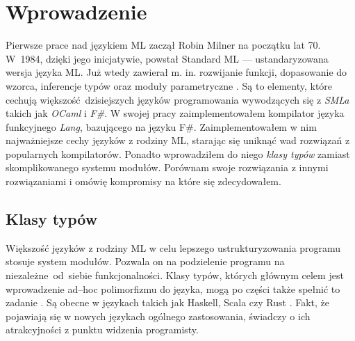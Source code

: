 \documentclass[declaration,shortabstract]{iithesis}
\author         {Mateusz Lewko}
\date           {}                     %
\begin{document}

\chapter{Wprowadzenie}

Pierwsze prace nad językiem ML zaczął Robin Milner na początku lat 70. W~1984, 
dzięki jego inicjatywie, powstał Standard ML --- ustandaryzowana wersja języka 
ML. Już wtedy zawierał m. in. rozwijanie funkcji, dopasowanie do wzorca, 
inferencje typów oraz moduły parametryczne \cite{sml_proposal}. Są to elementy,
które cechują większość dzisiejszych języków programowania 
wywodzących się z \textit{SMLa} takich jak \textit{OCaml} i \textit{F\#}. W 
swojej pracy zaimplementowałem kompilator języka funkcyjnego \textit{Lang}, 
bazującego na języku F\#. Zaimplementowałem w nim najważniejsze cechy języków 
z rodziny ML, starając się uniknąć wad rozwiązań z popularnych kompilatorów. 
Ponadto wprowadziłem do niego \textit{klasy typów} zamiast skomplikowanego 
systemu modułów. Porównam swoje rozwiązania z innymi rozwiązaniami i omówię 
kompromisy na które się zdecydowałem.


\section{Klasy typów}
Większość języków z rodziny ML w celu lepszego ustrukturyzowania
programu stosuje system modułów. Pozwala on na podzielenie programu na 
niezależne~od~siebie funkcjonalności.
Klasy typów, których głównym celem jest wprowadzenie 
ad--hoc polimorfizmu do języka, mogą po części także spełnić to zadanie 
\cite{modules_vs_typeclasses}. 
Są obecne w językach takich jak Haskell, Scala\cite{scala_traits} czy Rust
\cite{rust_traits}. Fakt, że pojawiają się
w nowych językach ogólnego zastosowania, świadczy o ich atrakcyjności z punktu 
widzenia programisty. 

\end{document}
